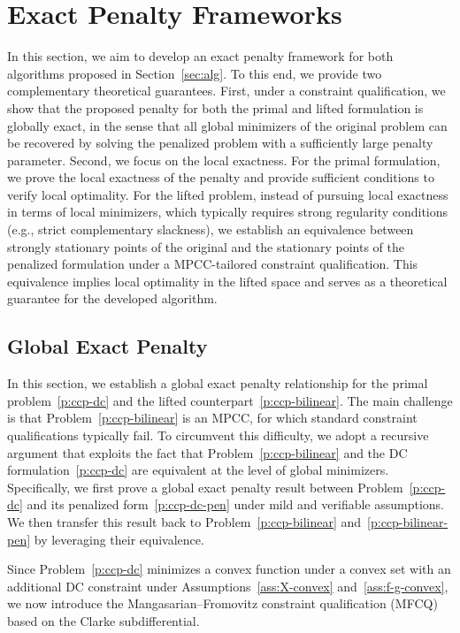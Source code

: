 \documentclass[11pt]{article}
\begin{document}
\section{Exact Penalty Frameworks} 
\label{sec:exact-penalty-framework}

In this section, we aim to develop an exact penalty framework for both algorithms proposed in Section~\ref{sec:alg}. To this end, we provide two complementary theoretical guarantees. First, under a constraint qualification, we show that the proposed penalty for both the primal and lifted formulation is globally exact, in the sense that all global minimizers of the original problem can be recovered by solving the penalized problem with a sufficiently large penalty parameter. Second, we focus on the local exactness. For the primal formulation, we prove the local exactness of the penalty and provide sufficient conditions to verify local optimality. For the lifted problem, instead of pursuing local exactness in terms of local minimizers, which typically requires strong regularity conditions (e.g., strict complementary slackness), we establish an equivalence between strongly stationary points of the original and the stationary points of the penalized formulation under a MPCC-tailored constraint qualification. This equivalence implies local optimality in the lifted space and serves as a theoretical guarantee for the developed algorithm.

\subsection{Global Exact Penalty}

In this section, we establish a global exact penalty relationship for the primal problem~\eqref{p:ccp-dc} and the lifted counterpart~\eqref{p:ccp-bilinear}. The main challenge is that Problem~\eqref{p:ccp-bilinear} is an MPCC, for which standard constraint qualifications typically fail. To circumvent this difficulty, we adopt a recursive argument that exploits the fact that Problem~\eqref{p:ccp-bilinear} and the DC formulation~\eqref{p:ccp-dc} are equivalent at the level of global minimizers. Specifically, we first prove a global exact penalty result between Problem~\eqref{p:ccp-dc} and its penalized form~\eqref{p:ccp-dc-pen} under mild and verifiable assumptions. We then transfer this result back to Problem~\eqref{p:ccp-bilinear} and~\eqref{p:ccp-bilinear-pen} by leveraging their equivalence.

Since Problem~\eqref{p:ccp-dc} minimizes a convex function under a convex set with an additional DC constraint under Assumptions~\ref{ass:X-convex} and~\ref{ass:f-g-convex}, we now introduce the Mangasarian--Fromovitz constraint qualification (MFCQ) based on the Clarke subdifferential.
\end{document}
